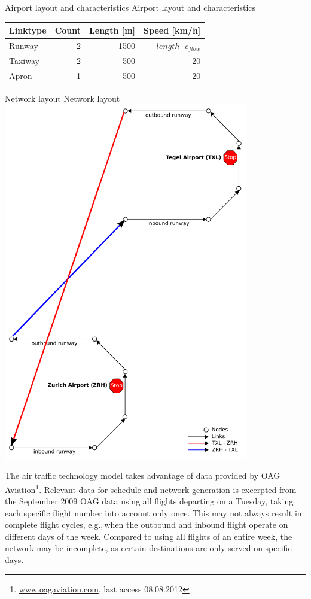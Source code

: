 {\citet{Grether2014PhD}}
%
\createtable%
{Airport layout and characteristics}%
{Airport layout and characteristics}%
{\label{fig:matsim_airport}}%
{%
  \begin{tabular}{lrrr}
		Linktype & Count & Length [m] & Speed [km/h] \\
		\hline
		Runway   	  & 2					& 1500	& $length \cdot c_{flow} $  	\\ %
		Taxiway   	& 2					& 500		& 20  	\\
		Apron   		& 1					& 500		& 20  	\\
	\end{tabular}	
}%
{}
%
\createfigure%
{Network layout}%
{Network layout}%
{\label{fig:matsim_network_model}}%
{\includegraphics[width=0.8\textwidth]{extending/figures/air/sf_airport_network_no_slide.pdf}}%
{}

The air traffic technology model takes advantage of data provided by OAG Aviation\footnote{\url{www.oagaviation.com}, last access 08.08.2012}. 
Relevant data for schedule and network generation is excerpted from the September 2009 OAG data using all flights departing on a Tuesday, taking each specific flight number into account only once.
This may not always result in complete flight cycles, e.g.,\,when the outbound and inbound flight operate on different days of the week. 
Compared to using all flights of an entire week, the network may be incomplete, as certain destinations are only served on specific days.

